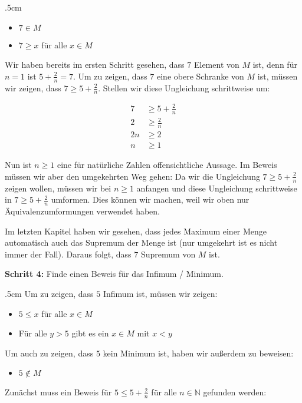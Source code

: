 \documentclass[fontsize=9pt,
               parskip=half-,
               DIV=14,
               listof=chapterentry,
               tocflat]{scrbook}
\newenvironment{indentblock}{\begin{adjustwidth}{.5cm}{}}{\end{adjustwidth}}
\newcommand{\proofstep}[1]{\textbf{\textcolor{sblau}{#1}}}
\begin{document}
\begin{solutionprocess*}
\begin{indentblock}
\begin{itemize}
\item $7\in M$
\item $7\geq x$ für alle $x\in M$
\end{itemize}

Wir haben bereits im ersten Schritt gesehen, dass $7$ Element von $M$ ist, denn für $n=1$ ist $5+{\tfrac {2}{n}}=7$. Um zu zeigen, dass $7$ eine obere Schranke von $M$ ist, müssen wir zeigen, dass $7\geq 5+{\tfrac {2}{n}}$. Stellen wir diese Ungleichung schrittweise um:

\begin{align*}
7&\geq 5+{\tfrac {2}{n}}\\2&\geq {\tfrac {2}{n}}\\2n&\geq 2\\n&\geq 1
\end{align*}

Nun ist $n\geq 1$ eine für natürliche Zahlen offensichtliche Aussage. Im Beweis müssen wir aber den umgekehrten Weg gehen: Da wir die Ungleichung $7\geq 5+{\tfrac {2}{n}}$ zeigen wollen, müssen wir bei $n\geq 1$ anfangen und diese Ungleichung schrittweise in $7\geq 5+{\tfrac {2}{n}}$ umformen. Dies können wir machen, weil wir oben nur Äquivalenzumformungen verwendet haben.

Im letzten Kapitel haben wir gesehen, dass jedes Maximum einer Menge automatisch auch das Supremum der Menge ist (nur umgekehrt ist es nicht immer der Fall). Daraus folgt, dass $7$ Supremum von $M$ ist.

\end{indentblock}

\proofstep{Schritt 4:}
 Finde einen Beweis für das Infimum / Minimum.\begin{indentblock}
Um zu zeigen, dass $5$ Infimum ist, müssen wir zeigen:

\begin{itemize}
\item $5\leq x$ für alle $x\in M$
\item Für alle $y>5$ gibt es ein $x\in M$ mit $x<y$
\end{itemize}

Um auch zu zeigen, dass $5$ kein Minimum ist, haben wir außerdem zu beweisen:

\begin{itemize}
\item $5\notin M$
\end{itemize}

Zunächst muss ein Beweis für $5\leq 5+{\tfrac {2}{n}}$ für alle $n\in \mathbb {N} $ gefunden werden:


\end{indentblock}
\end{solutionprocess*}
\end{document}

